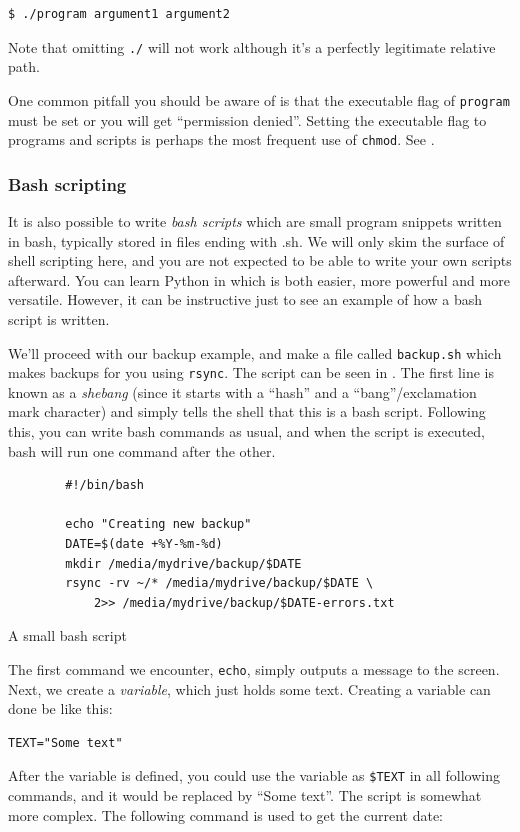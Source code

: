 \begin{verbatim}
$ ./program argument1 argument2
\end{verbatim}
Note that omitting \verb|./| will not work although it's a perfectly legitimate relative path.

One common pitfall you should be aware of is that the executable flag of \verb|program| must be set or you will get ``permission denied''. Setting the executable flag to programs and scripts is perhaps the most frequent use of \verb|chmod|. See .

\subsubsection{Bash scripting}
It is also possible to write \emph{bash scripts} which are small program snippets written in bash, typically stored in files ending with .sh. We will only skim the surface of shell scripting here, and you are not expected to be able to write your own scripts afterward. You can learn Python in  which is both easier, more powerful and more versatile. However, it can be instructive just to see an example of how a bash script is written.

We'll proceed with our backup example, and make a file called \verb|backup.sh| which makes backups for you using \verb|rsync|. The script can be seen in . The first line is known as a \emph{shebang} (since it starts with a ``hash'' and a ``bang''/exclamation mark character) and simply tells the shell that this is a bash script. Following this, you can write bash commands as usual, and when the script is executed, bash will run one command after the other.

\begin{listing}
	\begin{verbatim}
		#!/bin/bash

		echo "Creating new backup"
		DATE=$(date +%Y-%m-%d)
		mkdir /media/mydrive/backup/$DATE
		rsync -rv ~/* /media/mydrive/backup/$DATE \
			2>> /media/mydrive/backup/$DATE-errors.txt
	\end{verbatim}
	\caption{A small bash script}
	\label{lst:bash:script}
\end{listing}
The first command we encounter, \verb|echo|, simply outputs a message to the screen. Next, we create a \emph{variable}, which just holds some text. Creating a variable can done be like this:

\begin{verbatim}
TEXT="Some text"
\end{verbatim}
After the variable is defined, you could use the variable as \verb|$TEXT| in all following commands, and it would be replaced by ``Some text''. The script is somewhat more complex. The following command is used to get the current date:


